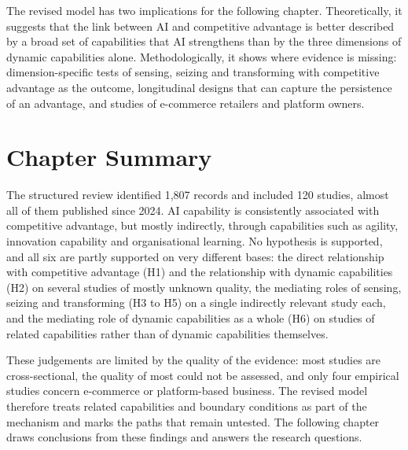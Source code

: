 The revised model has two implications for the following chapter. Theoretically, it suggests that the link between AI and competitive advantage is better described by a broad set of capabilities that AI strengthens than by the three dimensions of dynamic capabilities alone. Methodologically, it shows where evidence is missing: dimension-specific tests of sensing, seizing and transforming with competitive advantage as the outcome, longitudinal designs that can capture the persistence of an advantage, and studies of e-commerce retailers and platform owners.

\section{Chapter Summary}
\label{sec:ch4summary}

The structured review identified 1,807 records and included 120 studies, almost all of them published since 2024. AI capability is consistently associated with competitive advantage, but mostly indirectly, through capabilities such as agility, innovation capability and organisational learning. No hypothesis is supported, and all six are partly supported on very different bases: the direct relationship with competitive advantage (H1) and the relationship with dynamic capabilities (H2) on several studies of mostly unknown quality, the mediating roles of sensing, seizing and transforming (H3 to H5) on a single indirectly relevant study each, and the mediating role of dynamic capabilities as a whole (H6) on studies of related capabilities rather than of dynamic capabilities themselves.

These judgements are limited by the quality of the evidence: most studies are cross-sectional, the quality of most could not be assessed, and only four empirical studies concern e-commerce or platform-based business. The revised model therefore treats related capabilities and boundary conditions as part of the mechanism and marks the paths that remain untested. The following chapter draws conclusions from these findings and answers the research questions.
